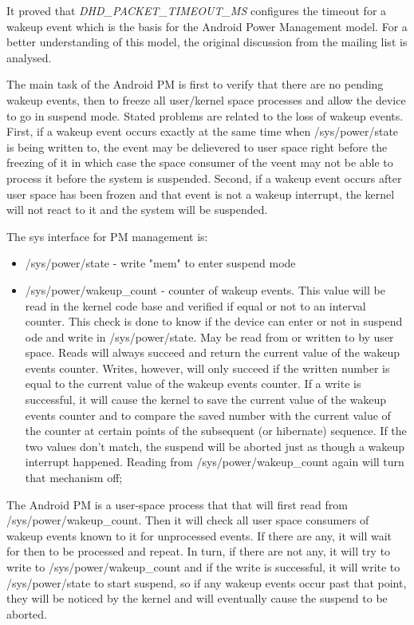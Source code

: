 It proved that \textit{DHD_PACKET_TIMEOUT_MS} configures the timeout for a wakeup event which is the basis for the Android Power Management model. For a better understanding of this model, the original discussion from the mailing list \cite{cite-wakesdiscussion} is analysed.

The main task of the Android PM is first to verify that there are no pending wakeup events, then to freeze all user/kernel space processes and allow the device to go in suspend mode. Stated problems are related to the loss of wakeup events. First, if a wakeup event occurs exactly at the same time when /sys/power/state is being written to, the event may be delievered to user space right before the freezing of it in which case the space consumer of the veent may not be able to process it before the system is suspended. Second, if a wakeup event occurs after user space has been frozen and that event is not a wakeup interrupt, the kernel will not react to it and the system will be suspended.

The sys interface for PM management is:
\begin{itemize}
  \item /sys/power/state - write "mem" to enter suspend mode
  \item /sys/power/wakeup_count - counter of wakeup events. This value will be read in the kernel code base and verified if equal or not to an interval counter. This check is done to know if the device can enter or not in suspend ode and write in /sys/power/state. May be read from or written to by user space. Reads will always succeed and return the current value of the wakeup events counter. Writes, however, will only succeed if the written number is equal to the current value of the wakeup events counter. If a write is successful, it will cause the kernel to save the current value of the wakeup events counter and to compare the saved number with the current value of the counter at certain points of the subsequent (or hibernate) sequence. If the two values don't match, the suspend will be aborted just as though a wakeup interrupt happened. Reading from /sys/power/wakeup_count again will turn that mechanism off;
\end{itemize}

The Android PM is a user-space process that that will first read from /sys/power/wakeup_count. Then it will check all user space consumers of wakeup events known to it for unprocessed events. If there are any, it will wait for then to be processed and repeat. In turn, if there are not any, it will try to write to /sys/power/wakeup_count and if the write is successful, it will write to /sys/power/state to start suspend, so if any wakeup events occur past that point, they will be noticed by the kernel and will eventually cause the suspend to be aborted.

